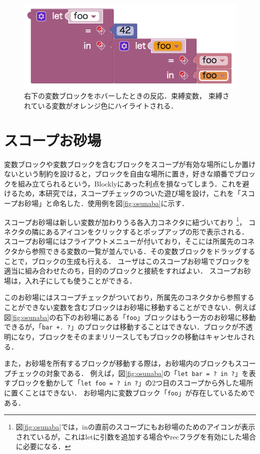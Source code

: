 \begin{figure}[h]
 \includegraphics[keepaspectratio, scale=0.3]{img/dupFooInt42.png}
 \caption{右下の変数ブロックをホバーしたときの反応．束縛変数，
束縛されている変数がオレンジ色にハイライトされる．\label{fig:dupFooHover}}
\end{figure}

\section {スコープお砂場}

変数ブロックや変数ブロックを含むブロックをスコープが有効な場所にしか置けないという制約を設けると，ブロックを自由な場所に置き，好きな順番でブロックを組み立てられるという，Blocklyにあった利点を損なってしまう．これを避けるため，本研究では，スコープチェックのついた遊び場を設け，これを「スコープお砂場」と命名した．使用例を図\ref{fig:osunaba}に示す．

スコープお砂場は新しい変数が加わりうる各入力コネクタに紐づいており
\footnote[2]{図\ref{fig:osunaba}では，inの直前のスコープにもお砂場のためのアイコンが表示されているが，これはletに引数を追加する場合やrecフラグを有効にした場合に必要になる．}，
コネクタの隣にあるアイコンをクリックするとポップアップの形で表示される．
スコープお砂場にはフライアウトメニューが付いており，そこには所属先のコネクタから参照できる変数の一覧が並んでいる．その変数ブロックをドラッグすることで，ブロックの生成も行える．
ユーザはこのスコープお砂場でブロックを適当に組み合わせたのち，目的のブロックと接続をすればよい．
スコープお砂場は，入れ子にしても使うことができる．

このお砂場にはスコープチェックがついており，所属先のコネクタから参照することができない変数を含むブロックはお砂場に移動することができない．例えば図\ref{fig:osunaba}の右下のお砂場にある「{\tt foo}」ブロックはもう一方のお砂場に移動できるが，「{\tt bar +.\ ?}」のブロックは移動することはできない．ブロックが不透明になり，ブロックをそのままリリースしてもブロックの移動はキャンセルされる．

また，お砂場を所有するブロックが移動する際は，お砂場内のブロックもスコープチェックの対象である．
例えば，図\ref{fig:osunaba}の「{\tt let bar = ?\ in ?}」を表すブロックを動かして「{\tt let foo = ?\ in ?}」の2つ目のスコープから外した場所に置くことはできない．
お砂場内に変数ブロック「{\tt foo}」が存在しているためである．

